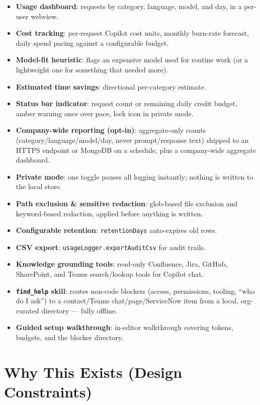 \documentclass[11pt,a4paper]{article}
\newcommand{\code}[1]{\texttt{\color{lloydsblue!80!black}#1}}
\begin{document}
\begin{itemize}[leftmargin=1.4em]
  \item \textbf{Usage dashboard}: requests by category, language, model, and day, in a per-user webview.
  \item \textbf{Cost tracking}: per-request Copilot cost units, monthly burn-rate forecast, daily spend pacing against a configurable budget.
  \item \textbf{Model-fit heuristic}: flags an expensive model used for routine work (or a lightweight one for something that needed more).
  \item \textbf{Estimated time savings}: directional per-category estimate.
  \item \textbf{Status bar indicator}: request count or remaining daily credit budget, amber warning once over pace, lock icon in private mode.
  \item \textbf{Company-wide reporting (opt-in)}: aggregate-only counts (category/language/model/day, never prompt/response text) shipped to an HTTPS endpoint or MongoDB on a schedule, plus a company-wide aggregate dashboard.
  \item \textbf{Private mode}: one toggle pauses all logging instantly; nothing is written to the local store.
  \item \textbf{Path exclusion \& sensitive redaction}: glob-based file exclusion and keyword-based redaction, applied before anything is written.
  \item \textbf{Configurable retention}: \code{retentionDays} auto-expires old rows.
  \item \textbf{CSV export}: \code{usageLogger.exportAuditCsv} for audit trails.
  \item \textbf{Knowledge grounding tools}: read-only Confluence, Jira, GitHub, SharePoint, and Teams search/lookup tools for Copilot chat.
  \item \textbf{\code{find\_help} skill}: routes non-code blockers (access, permissions, tooling, ``who do I ask'') to a contact/Teams chat/page/ServiceNow item from a local, org-curated directory --- fully offline.
  \item \textbf{Guided setup walkthrough}: in-editor walkthrough covering tokens, budgets, and the blocker directory.
\end{itemize}

\section{Why This Exists (Design Constraints)}
\end{document}
